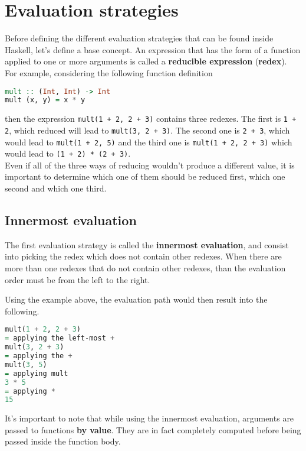 \section{Evaluation strategies}
Before defining the different evaluation strategies that can be found inside Haskell, let's define a base concept. An expression that has the form of a function applied to one or more arguments is called a \textbf{reducible expression} (\textbf{redex}). \\
For example, considering the following function definition

\begin{lstlisting}[language=haskell]
mult :: (Int, Int) -> Int
mult (x, y) = x * y
\end{lstlisting}

then the expression \texttt{mult(1 + 2, 2 + 3)} contains three redexes. The first is \texttt{1 + 2}, which reduced will lead to \texttt{mult(3, 2 + 3)}. The second one is \texttt{2 + 3}, which would lead to \texttt{mult(1 + 2, 5)} and the third one is \texttt{mult(1 + 2, 2 + 3)} which would lead to \texttt{(1 + 2) * (2 + 3)}. \\
Even if all of the three ways of reducing wouldn't produce a different value, it is important to determine which one of them should be reduced first, which one second and which one third. 

\subsection{Innermost evaluation}
The first evaluation strategy is called the \textbf{innermost evaluation}, and consist into picking the redex which does not contain other redexes. When there are more than one redexes that do not contain other redexes, than the evaluation order must be from the left to the right. 
\linebreak \linebreak

Using the example above, the evaluation path would then result into the following.

\begin{lstlisting}[language=haskell]
mult(1 + 2, 2 + 3)
= applying the left-most +
mult(3, 2 + 3)
= applying the +
mult(3, 5)
= applying mult
3 * 5
= applying *
15
\end{lstlisting}

It's important to note that while using the innermost evaluation, arguments are passed to functions \textbf{by value}. They are in fact completely computed before being passed inside the function body.

